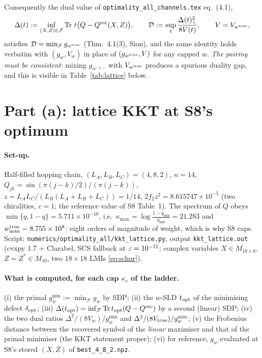 \documentclass[11pt]{article}
\begin{document}
\noindent Consequently the dual value of \texttt{optimality\_all\_channels.tex} eq.~(4.1),
\begin{equation}\label{eq:dual}
 \Delta(t):=\inf_{(X,Z)\in\mathcal F}\operatorname{Tr}\,t\bigl(Q-Q^{\rm rec}(X,Z)\bigr),\qquad
 \mathcal D:=\sup_t\frac{\Delta(t)_+^2}{8V(t)},\qquad V=V_{w^{\rm true}},
\end{equation}
satisfies $\mathcal D=\min_{\mathcal F}g_{w^{\rm true}}$ (Thm.~4.1(3), Sion), and the same
identity holds verbatim with $(g_w,V_w)$ in place of $(g_{w^{\rm true}},V)$ for any capped $w$.
\emph{The pairing must be consistent}: mixing $g_{w^{(\kappa_c)}}$ with $V_{w^{\rm true}}$ produces
a spurious duality gap, and this is visible in Table~\ref{tab:lattice} below.



\section{Part (a): lattice KKT at S8's optimum}
\label{sec:lattice}

\paragraph{Set-up.}  Half-filled hopping chain, $(L_A,L_B,L_C)=(4,8,2)$, $n=14$,
$Q_{jk}=\sin(\pi(j-k)/2)/(\pi(j-k))$, $z=L_AL_C/(L_B(L_A+L_B+L_C))=1/14$,
$2f_2z^2=8.615747\times10^{-5}$ (two chiralities, $c=1$; the reference value of S8 Table~1).
The spectrum of $Q$ obeys $\min\{q,1-q\}=5.711\times10^{-10}$, i.e.\
$\kappa_{\max}=\log\frac{1-q_{\min}}{q_{\min}}=21.283$ and $w^{\rm true}_{\max}=8.755\times10^{8}$:
eight orders of magnitude of weight, which is why S8 caps.  Script:
\texttt{numerics/optimality\_all/kkt\_lattice.py}, output \texttt{kkt\_lattice.out}
(cvxpy 1.7 + Clarabel, SCS fallback at $\varepsilon=10^{-11}$; complex variables $X\in M_{10\times8}$,
$Z=Z^*\in M_{10}$, two $18\times18$ LMIs \eqref{eq:schur}).

\paragraph{What is computed, for each cap $\kappa_c$ of the ladder.}
(i) the primal $g_{w}^{\min}:=\min_{\mathcal F}g_w$ by SDP;
(ii) the $w$-SLD $t_{\rm opt}$ of the minimising defect $\delta_{\rm opt}$;
(iii) $\Delta(t_{\rm opt})=\inf_{\mathcal F}\operatorname{Tr} t_{\rm opt}(Q-Q^{\rm rec})$ by a second (linear) SDP;
(iv) the two dual ratios $\Delta^2/(8V_w)/g^{\min}_w$ and $\Delta^2/(8V_{\rm true})/g^{\min}_w$;
(v) the Frobenius distance between the recovered symbol of the \emph{linear} maximiser and that
of the primal minimiser (the KKT statement proper);
(vi) for reference, $g_w$ evaluated at S8's stored $(X,Z)$ of \texttt{best\_4\_8\_2.npz}.
\end{document}
